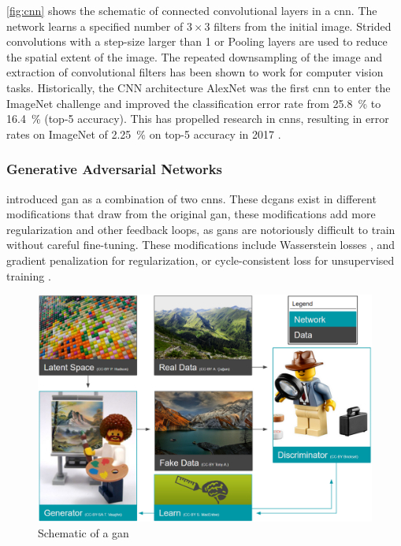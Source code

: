 \cref{fig:cnn} shows the schematic of connected convolutional layers in a \ac{cnn}. The network learns a specified number of $3\times3$ filters from the initial image. Strided convolutions with a step-size larger than 1 or Pooling layers are used to reduce the spatial extent of the image. The repeated downsampling of the image and extraction of convolutional filters has been shown to work for computer vision tasks. Historically, the CNN architecture AlexNet \citep{krizhevsky2012imagenet} was the first \ac{cnn} to enter the ImageNet challenge and improved the classification error rate from 25.8~\% to 16.4~\% (top-5 accuracy). This has propelled research in \acp{cnn}, resulting in error rates on ImageNet of 2.25~\% on top-5 accuracy in 2017 \citep{imagenetresults}.

\subsubsection{Generative Adversarial Networks}
\citet{Goodfellow2014-ax} introduced \acf{gan} as a combination of two \acp{cnn}. These \acfp{dcgan} exist in different modifications that draw from the original \ac{gan}, these modifications add more regularization and other feedback loops, as \acp{gan} are notoriously difficult to train without careful fine-tuning. These modifications include Wasserstein losses \citep{arjovsky2017wasserstein}, and gradient penalization \citep{gulrajani2017improved} for regularization, or cycle-consistent loss for unsupervised training \citep{zhu2017unpaired}.

\begin{figure}[H]
    \centering
    \includegraphics[width=\textwidth]{figures/GAN.PNG}
    \caption{Schematic of a \acl{gan}}
    \label{fig:gan}
\end{figure}

